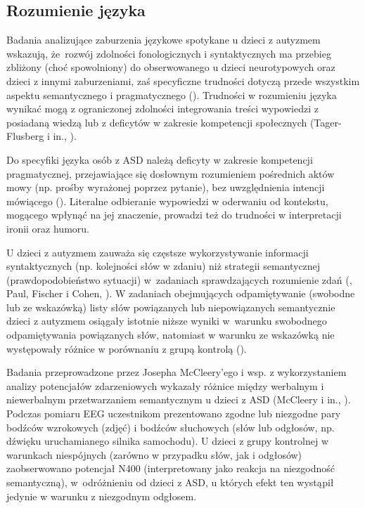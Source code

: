 
    \subsection{Rozumienie języka}
    \label{subsection:rozumienie}
    Badania analizujące zaburzenia językowe spotykane u dzieci z autyzmem wskazują, że~rozwój zdolności fonologicznych i syntaktycznych ma przebieg zbliżony (choć spowolniony) do obserwowanego u dzieci neurotypowych oraz dzieci z innymi zaburzeniami, zaś specyficzne trudności dotyczą przede wszystkim aspektu semantycznego i pragmatycznego (\cite{tager1981nature}).
    Trudności w rozumieniu języka wynikać mogą z ograniczonej zdolności integrowania treści wypowiedzi z posiadaną wiedzą lub z deficytów w zakresie kompetencji społecznych (Tager-Flusberg i in., \cite*{tager2005language}).
    
    Do specyfiki języka osób z ASD należą deficyty w zakresie kompetencji pragmatycznej, przejawiające się dosłownym rozumieniem pośrednich aktów mowy (np. prośby wyrażonej poprzez pytanie), bez uwzględnienia intencji mówiącego (\cite{frith2008autyzm}).
    Literalne odbieranie wypowiedzi w oderwaniu od kontekstu, mogącego wpłynąć na jej znaczenie, prowadzi też do trudności w interpretacji ironii oraz humoru.
    
    U dzieci z autyzmem zauważa się częstsze wykorzystywanie informacji syntaktycznych (np. kolejności słów w zdaniu) niż strategii semantycznej (prawdopodobieństwo sytuacji) w~zadaniach sprawdzających rozumienie zdań (\cite{tager1981sentence}, Paul, Fischer i Cohen, \cite*{paul1988brief}).
    W zadaniach obejmujących odpamiętywanie (swobodne lub ze wskazówką) listy słów powiązanych lub niepowiązanych semantycznie dzieci z autyzmem osiągały istotnie niższe wyniki w~warunku swobodnego odpamiętywania powiązanych słów, natomiast w warunku ze wskazówką nie występowały różnice w porównaniu z grupą kontrolą (\cite{tager1991semantic}).
    
    Badania przeprowadzone przez Josepha McCleery'ego i wsp. z wykorzystaniem analizy potencjałów zdarzeniowych wykazały różnice między werbalnym i niewerbalnym przetwarzaniem semantycznym u dzieci z ASD (McCleery i in., \cite*{mccleery2010neural}).
    Podczas pomiaru EEG uczestnikom prezentowano zgodne lub niezgodne pary bodźców wzrokowych (zdjęć) i bodźców słuchowych (słów lub odgłosów, np. dźwięku uruchamianego silnika samochodu).
    U dzieci z grupy kontrolnej w warunkach niespójnych (zarówno w przypadku słów, jak i odgłosów) zaobserwowano potencjał N400 (interpretowany jako reakcja na niezgodność semantyczną), w~odróżnieniu od dzieci z ASD, u których efekt ten wystąpił jedynie w warunku z niezgodnym odgłosem.
    
